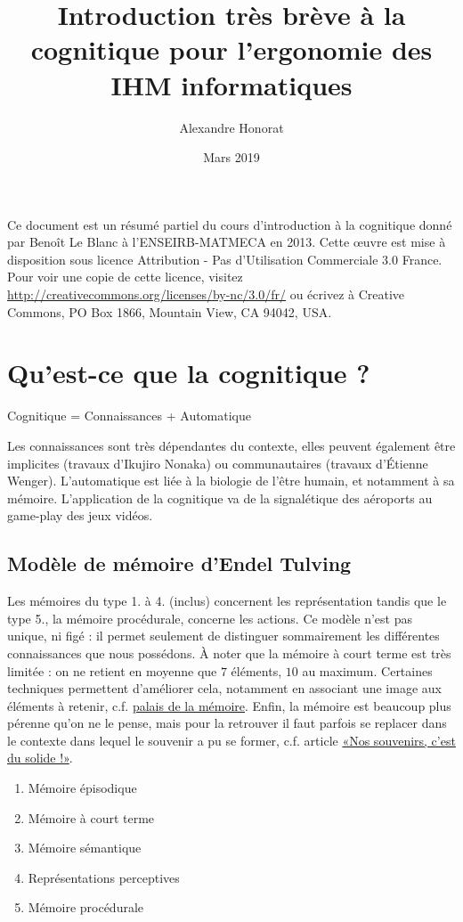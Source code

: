 \documentclass[10pt]{article}
\title{Introduction très brève à la cognitique pour l'ergonomie des IHM informatiques}
\author{Alexandre Honorat}
\date{Mars 2019}
\begin{document}
\maketitle

Ce document est un résumé partiel du cours d'introduction à la cognitique donné par
Benoît Le Blanc à l'ENSEIRB-MATMECA en 2013.
Cette œuvre est mise à disposition sous licence
Attribution - Pas d’Utilisation Commerciale 3.0 France.
Pour voir une copie de cette licence, visitez \url{http://creativecommons.org/licenses/by-nc/3.0/fr/}
ou écrivez à Creative Commons, PO Box 1866, Mountain View, CA 94042, USA.


\section{Qu'est-ce que la cognitique ?}

Cognitique = Connaissances + Automatique

Les connaissances sont très dépendantes du contexte, elles peuvent également être implicites (travaux d'Ikujiro Nonaka)
ou communautaires (travaux d'{\' E}tienne Wenger). L'automatique est liée à la biologie de l'être humain, et notamment
à sa mémoire. L'application de la cognitique va de la signalétique des aéroports au game-play des jeux vidéos.

\subsection{Modèle de mémoire d'Endel Tulving}

Les mémoires du type 1. à 4. (inclus) concernent les représentation tandis que le type 5., la mémoire procédurale,
concerne les actions. Ce modèle n'est pas unique, ni figé : il permet seulement de distinguer sommairement
les différentes connaissances que nous possédons. À noter que la mémoire à court terme est très limitée :
on ne retient en moyenne que $7$ éléments, $10$ au maximum. Certaines techniques permettent d'améliorer cela,
notamment en associant une image aux éléments à retenir, c.f.
\href{https://fr.wikipedia.org/wiki/M\%C3\%A9thode_des_loci}{palais de la mémoire}.
Enfin, la mémoire est beaucoup plus pérenne qu'on ne le pense, mais pour la retrouver il faut parfois
se replacer dans le contexte dans lequel le souvenir a pu se former, c.f. article
\href{https://lejournal.cnrs.fr/billets/nos-souvenirs-cest-du-solide}{«Nos souvenirs, c'est du solide !»}.


\begin{enumerate}
\item{Mémoire épisodique}
\item{Mémoire à court terme}
\item{Mémoire sémantique}
\item{Représentations perceptives}
\item{Mémoire procédurale}
\end{enumerate}
\end{document}
